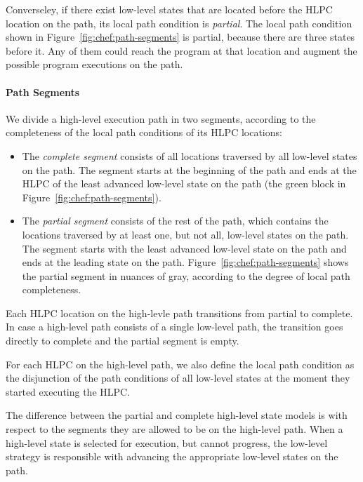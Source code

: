 Converseley, if there exist low-level states that are located before the HLPC location on the path, its local path condition is \emph{partial}.
%
The local path condition shown in Figure~\ref{fig:chef:path-segments} is partial, because there are three states before it.
%
Any of them could reach the program at that location and augment the possible program executions on the path.

\paragraph{Path Segments}

We divide a high-level execution path in two segments, according to the completeness of the local path conditions of its HLPC locations:
\begin{itemize}
\item The \emph{complete segment} consists of all locations traversed by all low-level states on the path.
%
The segment starts at the beginning of the path and ends at the HLPC of the least advanced low-level state on the path (the green block in Figure~\ref{fig:chef:path-segments}).
\item The \emph{partial segment} consists of the rest of the path, which contains the locations traversed by at least one, but not all, low-level states on the path.
%
The segment starts with the least advanced low-level state on the path and ends at the leading state on the path.  Figure~\ref{fig:chef:path-segments} shows the partial segment in nuances of gray, according to the degree of local path completeness.
\end{itemize}

Each HLPC location on the high-levle path transitions from partial to complete.
%
In case a high-level path consists of a single low-level path, the transition goes directly to complete and the partial segment is empty.

For each HLPC on the high-level path, we also define the local path condition as the disjunction of the path conditions of all low-level states at the moment they started executing the HLPC.

The difference between the partial and complete high-level state models is with respect to the segments they are allowed to be on the high-level path.
%
When a high-level state is selected for execution, but cannot progress, the low-level strategy is responsible with advancing the appropriate low-level states on the path.


